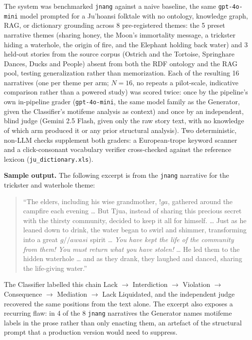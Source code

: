 \documentclass[pdflatex,sn-mathphys-num]{sn-jnl}%
\newcommand{\juhoansi}{\mbox{Ju\textbar{}'hoansi}}%
\theoremstyle{thmstyleone}%
\theoremstyle{thmstyletwo}%
\theoremstyle{thmstylethree}%
\begin{document}
 The system was benchmarked \texttt{jnang} against a naive baseline,  the same \texttt{gpt-4o-mini} model prompted for a \juhoansi{} folktale with no ontology, knowledge graph, RAG, or dictionary grounding across 8 pre-registered themes: the 5 preset narrative themes (sharing honey, the Moon's immortality message, a trickster hiding a waterhole, the origin of fire, and the Elephant holding back water) and 3 held-out stories from the source corpus (Ostrich and the Tortoise, Springhare Dances, Ducks and People) absent from both the RDF ontology and the RAG pool, testing generalization rather than memorization. Each of the resulting 16 narratives (one per theme per arm; $N=16$, no repeats  a pilot-scale, indicative comparison rather than a powered study) was scored twice: once by the pipeline's own in-pipeline grader (\texttt{gpt-4o-mini}, the same model family as the Generator, given the Classifier's motifeme analysis as context) and once by an independent, blind judge (Gemini 2.5 Flash, given only the raw story text, with no knowledge of which arm produced it or any prior structural analysis). Two deterministic, non-LLM checks supplement both graders: a European-trope keyword scanner and a click-consonant vocabulary verifier cross-checked against the reference lexicon (\texttt{ju\_dictionary.xls}).
 
\noindent\textbf{Sample output.} The following excerpt is from the \texttt{jnang} narrative for the trickster and waterhole theme:

\begin{quote}
\small
``The elders, including his wise grandmother, $!ga$, gathered around the campfire each evening
\ldots{} But Tjua, instead of sharing this precious secret with the thirsty community, decided to
keep it all for himself. \ldots{} Just as he leaned down to drink, the water began to swirl and
shimmer, transforming into a great $g//awasi$ spirit \ldots{} \emph{You have kept the life of the
community from them! You must return what you have stolen!} \ldots{} He led them to the hidden
waterhole \ldots{} and as they drank, they laughed and danced, sharing the life-giving water.''
\end{quote}

\noindent The Classifier labelled this chain Lack $\rightarrow$ Interdiction $\rightarrow$
Violation $\rightarrow$ Consequence $\rightarrow$ Mediation $\rightarrow$ Lack Liquidated, and the
independent judge recovered the same positions from the text alone. The excerpt also exposes a
recurring flaw: in 4 of the 8 \texttt{jnang} narratives the Generator names motifeme labels in the
prose rather than only enacting them, an artefact of the structural prompt that a production
version would need to suppress.
\end{document}
